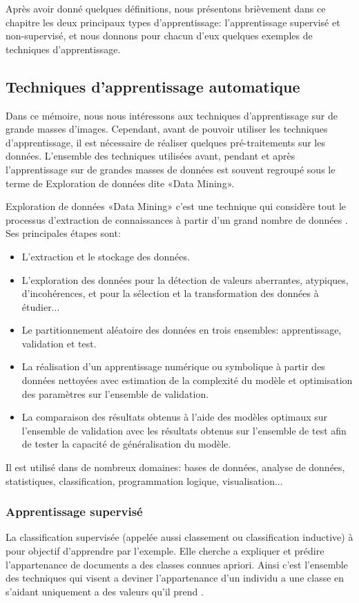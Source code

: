 \documentclass[12pt]{article}
\begin{document}
Après avoir donné quelques définitions, nous présentons brièvement dans ce chapitre les deux principaux types d'apprentissage: l'apprentissage supervisé et non-supervisé, et nous donnons pour chacun d'eux quelques exemples de techniques d'apprentissage.
\subsection{Techniques d'apprentissage automatique}
Dans ce mémoire, nous nous intéressons aux techniques d'apprentissage sur de grande masses d'images. Cependant, avant de pouvoir utiliser les techniques d'apprentissage, il est nécessaire de réaliser quelques pré-traitements sur les données. L'ensemble des techniques utilisées avant, pendant et après l'apprentissage sur de grandes masses de données est souvent regroupé sous le terme de Exploration de données dite «Data Mining».

Exploration de données «Data Mining» c’est une technique qui considère tout le processus d'extraction de connaissances à partir d'un grand nombre de données \cite{1}. Ses principales étapes sont:
\begin{itemize}
  	  \item L'extraction et le stockage des données.
  	  \item L'exploration des données pour la détection de valeurs aberrantes, atypiques, d'incohérences, et pour la sélection et la transformation des données à étudier...
  	\item Le partitionnement aléatoire des données en trois ensembles: apprentissage, validation et test.
  	\item La réalisation d'un apprentissage numérique ou symbolique à partir des données nettoyées avec estimation de la complexité du modèle et optimisation des paramètres sur l'ensemble de validation.
  	\item La comparaison des résultats obtenus à l'aide des modèles optimaux sur l'ensemble de validation avec les résultats obtenus sur l'ensemble de test afin de tester la capacité de généralisation du modèle.\\
\end{itemize}

Il est utilisé dans de nombreux domaines: bases de données, analyse de données, statistiques, classification, programmation logique, visualisation...
\subsubsection{Apprentissage supervisé}
La classification supervisée (appelée aussi classement ou classification inductive) à pour objectif d'apprendre par l'exemple. Elle cherche a expliquer et prédire l’appartenance de documents a des classes connues apriori. Ainsi c'est l'ensemble des techniques qui visent a deviner l'appartenance d'un individu a une classe en s'aidant uniquement a des valeurs qu'il prend \cite{2}.
\end{document}
